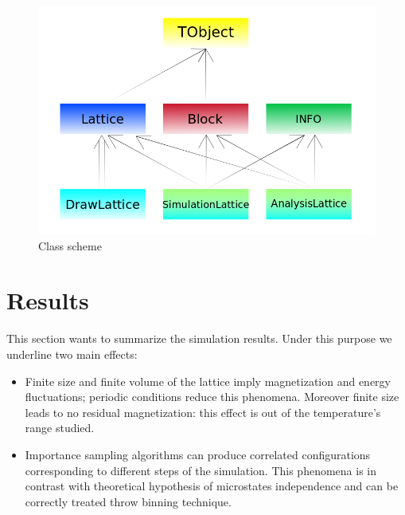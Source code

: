 \documentclass[11pt,a4paper]{article}
\begin{document}
\begin{figure}[h!]
  \centering
  \includegraphics[scale=0.45]{img/Schema_classi.png}
  \caption{Class scheme}
\end{figure}






%   

























\newpage
\section{Results}
This section wants to summarize the simulation results. Under this purpose we underline two main effects:

\begin{itemize}
\item Finite size and finite volume of the lattice imply magnetization and energy fluctuations; periodic conditions reduce this phenomena. Moreover finite size leads to no residual magnetization: this effect is out of the temperature's range studied.

\item Importance sampling algorithms can produce correlated configurations corresponding to different steps of the simulation. This phenomena is in contrast with theoretical hypothesis of microstates independence and can be correctly treated throw binning technique. 

\end{itemize}
\end{document}
